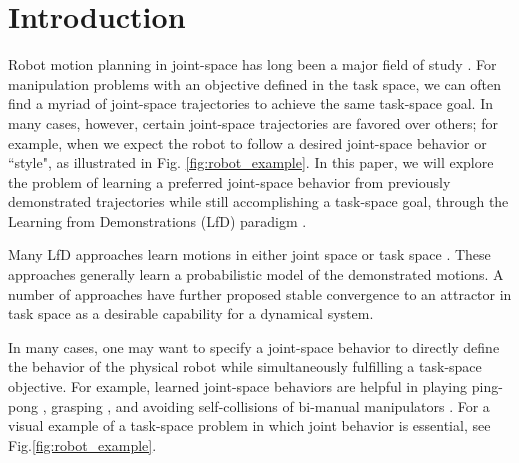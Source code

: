 \documentclass[letterpaper, 10 pt, conference,fleqn]{ieeeconf}
\begin{document}



\IEEEpeerreviewmaketitle
\section{Introduction}
\label{sec:intro}
Robot motion planning in joint-space has long been a major field of study \cite{kelly2006control}. For manipulation problems with an objective defined in the task space, %
 we can often find a myriad of joint-space trajectories to achieve the same task-space goal. In many cases, however, certain joint-space trajectories are favored over others; for example, when we expect the robot to follow a desired joint-space behavior or ``style", as illustrated in Fig. \ref{fig:robot_example}. In this paper, we will explore the problem of learning a preferred joint-space behavior from previously demonstrated trajectories while still accomplishing a task-space goal, through the Learning from Demonstrations (LfD) paradigm \cite{billard2008robot,Argall:RAS:2009}.

Many LfD approaches learn motions in either joint space %
\cite{Garrido:Neuro:2015,Schaal:AI:2002} or task space %
\cite{Pastor:ICRA:2009,Calinon:ISR:2015}. These approaches generally learn a probabilistic model of the demonstrated motions. %
A number of approaches have further proposed stable convergence to an attractor in task space %
 \cite{khansari2011learning, Neumann:RAS:2015}as a desirable capability for a dynamical system.

	In many cases, one may want to specify a joint-space behavior to directly define the behavior of the physical robot while simultaneously fulfilling a task-space objective. For example, %
learned joint-space behaviors are helpful in playing ping-pong \cite{huang2016jointly}, grasping \cite{calinon2010learning}, and avoiding self-collisions of bi-manual manipulators \cite{silverio2017learning}. For a visual example of a task-space problem in which joint behavior is essential, see Fig.\ref{fig:robot_example}.
\end{document}
